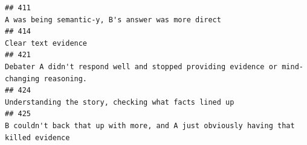 \documentclass[
]{article}
\begin{document}
\begin{verbatim}
## 411                                                                                                                                                                                                                                                                                                                                                                                                                                                                                                                                                 A was being semantic-y, B's answer was more direct
## 414                                                                                                                                                                                                                                                                                                                                                                                                                                                                                                                                                                                Clear text evidence
## 421                                                                                                                                                                                                                                                                                                                                                                                                                                                                                                           Debater A didn't respond well and stopped providing evidence or mind-changing reasoning.
## 424                                                                                                                                                                                                                                                                                                                                                                                                                                                                                                                                              Understanding the story, checking what facts lined up
## 425                                                                                                                                                                                                                                                                                                                                                                                                                                                                                                                B couldn't back that up with more, and A just obviously having that killed evidence

\end{verbatim}
\end{document}
